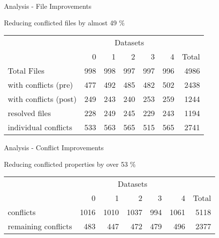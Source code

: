 \documentclass{beamer}
\begin{document}
\begin{frame}{Analysis - File Improvements}

Reducing conflicted files by almost 49 \%

\begin{table}[ht]
\begin{center}

\begin{tabular}[h]{l||r|r|r|r|r||r}
 &  \multicolumn{5}{c}{Datasets} \\
        & 0 & 1 & 2 & 3 & 4 & Total \\
\hline
Total Files & 998 & 998 & 997 & 997 & 996 & 4986\\ 
\hline
with conflicts (pre) & 477 &	492 & 485 & 482	& 502 &	2438\\ 
with conflicts (post) & 249	& 243 &	240 & 253 &	259 & 1244\\
\hline
resolved files & 228 & 249 & 245 & 229 & 243 & 1194 \\
individual conflicts & 533 & 563 & 565 & 515 & 565 & 2741 \\


\end{tabular}
\end{center}
\end{table}

  \note{

  }

\end{frame}

\begin{frame}{Analysis - Conflict Improvements}

Reducing conflicted properties by over 53 \%

\begin{table}[ht]
\begin{center}
\begin{tabular}[h]{l||r|r|r|r|r||r}
 &  \multicolumn{5}{c}{Datasets} \\
        & 0 & 1 & 2 & 3 & 4 & Total \\
\hline
conflicts & 1016 & 1010	& 1037 & 994 &1061 & 5118 \\
\hline
remaining conflicts & 483 &	447	& 472 &	479	& 496 &	2377

\end{tabular}
\end{center}
\label{tab:conflicts}
\end{table}

  \note{

  }

\end{frame}
\end{document}
